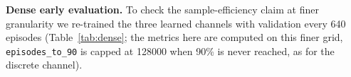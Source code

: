 \begin{table}[t]\centering\caption{Discrete channel, Gumbel temperature $\tau$ (mean $\pm$ std over 5 seeds, $V{=}4$).}\label{tab:tau}
\resizebox{\columnwidth}{!}{}\end{table}

\textbf{Dense early evaluation.} To check the sample-efficiency claim at finer granularity we re-trained the three learned channels with validation every 640 episodes (Table~\ref{tab:dense}; the metrics here are computed on this finer grid, \texttt{episodes\_to\_90} is capped at 128000 when 90\% is never reached, as for the discrete channel).

\begin{table}[t]\centering\caption{Dense evaluation (every 640 episodes), mean $\pm$ std over 5 seeds.}\label{tab:dense}
\resizebox{\columnwidth}{!}{}\end{table}
